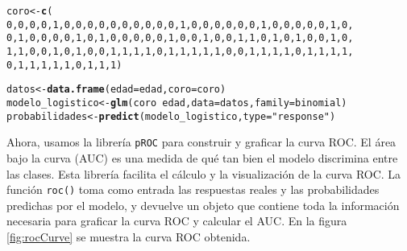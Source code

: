 \documentclass[paper=letter, fontsize=11pt]{scrartcl}\usepackage[]{graphicx}\usepackage[]{xcolor}
\makeatletter
\newcommand{\hlnum}[1]{\textcolor[rgb]{0.686,0.059,0.569}{#1}}%
\newcommand{\hlsng}[1]{\textcolor[rgb]{0.192,0.494,0.8}{#1}}%
\newcommand{\hlopt}[1]{\textcolor[rgb]{0,0,0}{#1}}%
\newcommand{\hldef}[1]{\textcolor[rgb]{0.345,0.345,0.345}{#1}}%
\newcommand{\hlkwb}[1]{\textcolor[rgb]{0.69,0.353,0.396}{#1}}%
\newcommand{\hlkwc}[1]{\textcolor[rgb]{0.333,0.667,0.333}{#1}}%
\newcommand{\hlkwd}[1]{\textcolor[rgb]{0.737,0.353,0.396}{\textbf{#1}}}%
\newenvironment{kframe}{%
 \def\at@end@of@kframe{}%
 \ifinner\ifhmode%
  \def\at@end@of@kframe{\end{minipage}}%
  \begin{minipage}{\columnwidth}%
 \fi\fi%
 \def\FrameCommand##1{\hskip\@totalleftmargin \hskip-\fboxsep
 \colorbox{shadecolor}{##1}\hskip-\fboxsep
     \hskip-\linewidth \hskip-\@totalleftmargin \hskip\columnwidth}%
 \MakeFramed {\advance\hsize-\width
   \@totalleftmargin\z@ \linewidth\hsize
   \@setminipage}}%
 {\par\unskip\endMakeFramed%
 \at@end@of@kframe}
\newenvironment{knitrout}{}{} %
\numberwithin{equation}{problemcounter} %
\numberwithin{figure}{problemcounter} %
\numberwithin{table}{problemcounter} %
\numberwithin{subsection}{problemcounter}
\makeatother
\begin{document}
\begin{knitrout}
\begin{kframe}
\begin{alltt}
\hldef{coro} \hlkwb{<-} \hlkwd{c}\hldef{(}
    \hlnum{0}\hldef{,}\hlnum{0}\hldef{,}\hlnum{0}\hldef{,}\hlnum{0}\hldef{,}\hlnum{1}\hldef{,}\hlnum{0}\hldef{,}\hlnum{0}\hldef{,}\hlnum{0}\hldef{,}\hlnum{0}\hldef{,}\hlnum{0}\hldef{,}\hlnum{0}\hldef{,}\hlnum{0}\hldef{,}\hlnum{0}\hldef{,}\hlnum{0}\hldef{,}\hlnum{0}\hldef{,}\hlnum{1}\hldef{,}\hlnum{0}\hldef{,}\hlnum{0}\hldef{,}\hlnum{0}\hldef{,}\hlnum{0}\hldef{,}\hlnum{0}\hldef{,}\hlnum{0}\hldef{,}\hlnum{1}\hldef{,}\hlnum{0}\hldef{,}\hlnum{0}\hldef{,}\hlnum{0}\hldef{,}\hlnum{0}\hldef{,}\hlnum{0}\hldef{,}\hlnum{1}\hldef{,}\hlnum{0}\hldef{,}
    \hlnum{0}\hldef{,}\hlnum{1}\hldef{,}\hlnum{0}\hldef{,}\hlnum{0}\hldef{,}\hlnum{0}\hldef{,}\hlnum{0}\hldef{,}\hlnum{1}\hldef{,}\hlnum{0}\hldef{,}\hlnum{1}\hldef{,}\hlnum{0}\hldef{,}\hlnum{0}\hldef{,}\hlnum{0}\hldef{,}\hlnum{0}\hldef{,}\hlnum{0}\hldef{,}\hlnum{1}\hldef{,}\hlnum{0}\hldef{,}\hlnum{0}\hldef{,}\hlnum{1}\hldef{,}\hlnum{0}\hldef{,}\hlnum{0}\hldef{,}\hlnum{1}\hldef{,}\hlnum{1}\hldef{,}\hlnum{0}\hldef{,}\hlnum{1}\hldef{,}\hlnum{0}\hldef{,}\hlnum{1}\hldef{,}\hlnum{0}\hldef{,}\hlnum{0}\hldef{,}\hlnum{1}\hldef{,}\hlnum{0}\hldef{,}
    \hlnum{1}\hldef{,}\hlnum{1}\hldef{,}\hlnum{0}\hldef{,}\hlnum{0}\hldef{,}\hlnum{1}\hldef{,}\hlnum{0}\hldef{,}\hlnum{1}\hldef{,}\hlnum{0}\hldef{,}\hlnum{0}\hldef{,}\hlnum{1}\hldef{,}\hlnum{1}\hldef{,}\hlnum{1}\hldef{,}\hlnum{1}\hldef{,}\hlnum{0}\hldef{,}\hlnum{1}\hldef{,}\hlnum{1}\hldef{,}\hlnum{1}\hldef{,}\hlnum{1}\hldef{,}\hlnum{1}\hldef{,}\hlnum{0}\hldef{,}\hlnum{0}\hldef{,}\hlnum{1}\hldef{,}\hlnum{1}\hldef{,}\hlnum{1}\hldef{,}\hlnum{1}\hldef{,}\hlnum{0}\hldef{,}\hlnum{1}\hldef{,}\hlnum{1}\hldef{,}\hlnum{1}\hldef{,}\hlnum{1}\hldef{,}
    \hlnum{0}\hldef{,}\hlnum{1}\hldef{,}\hlnum{1}\hldef{,}\hlnum{1}\hldef{,}\hlnum{1}\hldef{,}\hlnum{1}\hldef{,}\hlnum{0}\hldef{,}\hlnum{1}\hldef{,}\hlnum{1}\hldef{,}\hlnum{1}\hldef{)}

\hldef{datos} \hlkwb{<-} \hlkwd{data.frame}\hldef{(}\hlkwc{edad} \hldef{= edad,} \hlkwc{coro} \hldef{= coro)}
\hldef{modelo_logistico} \hlkwb{<-} \hlkwd{glm}\hldef{(coro} \hlopt{~} \hldef{edad,} \hlkwc{data} \hldef{= datos,} \hlkwc{family} \hldef{= binomial)}
\hldef{probabilidades} \hlkwb{<-} \hlkwd{predict}\hldef{(modelo_logistico,} \hlkwc{type} \hldef{=} \hlsng{"response"}\hldef{)}
\end{alltt}
\end{kframe}
\end{knitrout}

Ahora, usamos la librería \texttt{pROC} para construir y graficar la curva ROC. El área bajo la curva (AUC) es una medida de qué tan bien el modelo discrimina entre las clases. Esta librería facilita el cálculo y la visualización de la curva ROC. La función \texttt{roc()} toma como entrada las respuestas reales y las probabilidades predichas por el modelo, y devuelve un objeto que contiene toda la información necesaria para graficar la curva ROC y calcular el AUC. En la figura \ref{fig:rocCurve} se muestra la curva ROC obtenida.
\end{document}
